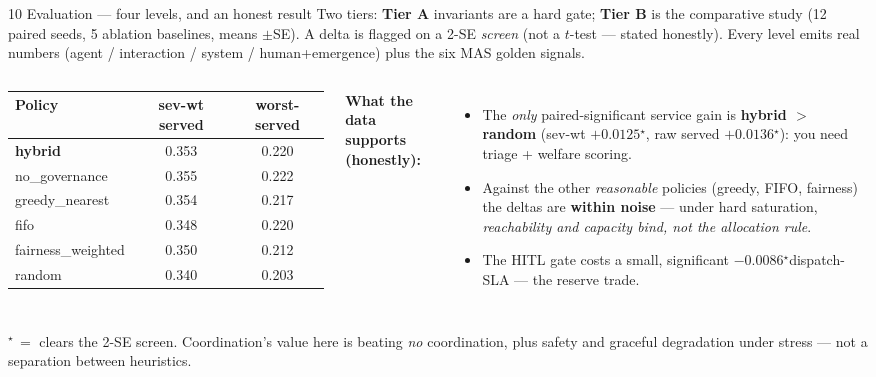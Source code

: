 \documentclass[aspectratio=169,11pt]{beamer}
\newcommand{\sig}{$^{\star}$}
\begin{document}
\begin{frame}{10 \;\; Evaluation --- four levels, and an honest result}
  \scriptsize
  Two tiers: \textbf{Tier A} invariants are a hard gate; \textbf{Tier B} is the comparative study
  (12 paired seeds, 5 ablation baselines, means $\pm$SE). A delta is flagged on a 2-SE \emph{screen}
  (not a $t$-test --- stated honestly). Every level emits real numbers (agent / interaction / system /
  human+emergence) plus the six MAS golden signals.
  \vspace{0.3em}
  \begin{columns}[T]
    \begin{tabular}{@{}lcc@{}}
      \toprule
      Policy & sev-wt served & worst-served \\
      \midrule
      \textbf{hybrid} & 0.353 & 0.220 \\
      no\_governance & 0.355 & 0.222 \\
      greedy\_nearest & 0.354 & 0.217 \\
      fifo & 0.348 & 0.220 \\
      fairness\_weighted & 0.350 & 0.212 \\
      random & 0.340 & 0.203 \\
      \bottomrule
    \end{tabular}
    \textbf{What the data supports (honestly):}
    \begin{itemize}
      \item The \emph{only} paired-significant service gain is \textbf{hybrid $>$ random}
        (sev-wt $+0.0125$\sig, raw served $+0.0136$\sig): you need triage + welfare scoring.
      \item Against the other \emph{reasonable} policies (greedy, FIFO, fairness) the deltas are
        \textbf{within noise} --- under hard saturation, \emph{reachability and capacity bind, not the
        allocation rule}.
      \item The HITL gate costs a small, significant $-0.0086$\sig dispatch-SLA --- the reserve trade.
    \end{itemize}
  \end{columns}
  \vspace{0.2em}
  \footnotesize\sig\,$=$ clears the 2-SE screen. Coordination's value here is beating \emph{no}
  coordination, plus safety and graceful degradation under stress --- not a separation between heuristics.
\end{frame}
\end{document}
